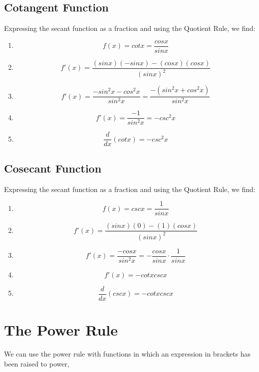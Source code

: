 \documentclass[a4paper,11pt]{book}
\begin{document}
\normalsize 












\subsection{Cotangent Function}
Expressing the secant function as a fraction and using the Quotient Rule, we find:
\LARGE 
\begin{enumerate}
  \item \[ f(x) = cotx = \frac{cosx}{sinx} \]
  \item \[ f'(x) = \frac{(sinx)(-sinx)-(cosx)(cosx)}{(sinx)^2} \] 
  \item \[ f'(x) = \frac{-sin^2x-cos^2x}{sin^2x} = \frac{-(sin^2x + cos^2x)}{sin^2x} \]
  \item \[ f'(x) = \frac{-1}{sin^2x} = -csc^2x \]  
  \item \[ \frac{d}{dx}(cotx) = -csc^2x \]
\end{enumerate}

\normalsize 












\subsection{Cosecant Function}
Expressing the secant function as a fraction and using the Quotient Rule, we find:
\LARGE 
\begin{enumerate}
  \item \[ f(x) = cscx = \frac{1}{sinx} \]
  \item \[ f'(x) = \frac{(sinx)(0)-(1)(cosx)}{(sinx)^2} \]
  \item \[ f'(x) = \frac{-cosx}{sin^2x} = -\frac{cosx}{sinx}\cdot \frac{1}{sinx} \]
  \item \[ f'(x) = -cotxcscx \] 
  \item \[ \frac{d}{dx}(cscx) = -cotxcscx \]
\end{enumerate}
\normalsize 










\section{The Power Rule}
\normalsize 
We can use the power rule with functions in which an expression in brackets has been raised to power,
\end{document}
